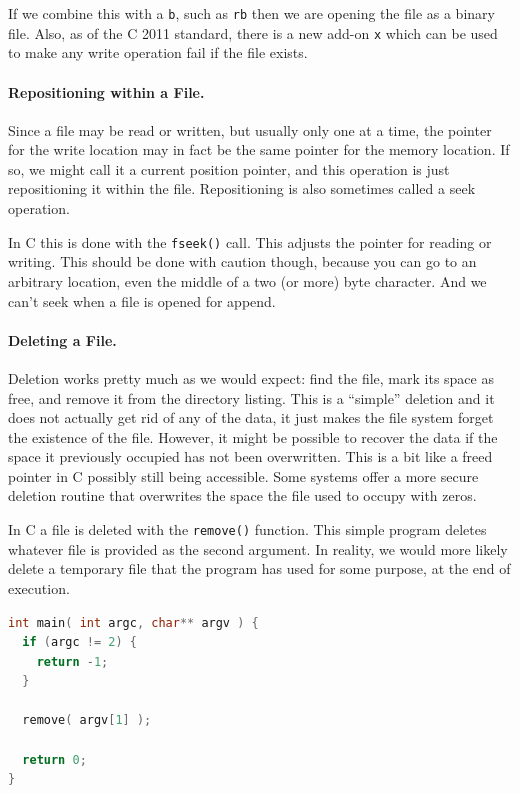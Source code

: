 \documentclass[a4paper]{report}
\begin{document}
If we combine this with a \texttt{b}, such as \texttt{rb} then we are opening the file as a binary file. Also, as of the C 2011 standard, there is a new add-on \texttt{x} which can be used to make any write operation fail if the file exists.

\paragraph{Repositioning within a File.} Since a file may be read or written, but usually only one at a time, the pointer for the write location may in fact be the same pointer for the memory location. If so, we might call it a current position pointer, and this operation is just repositioning it within the file. Repositioning is also sometimes called a seek operation.

In C this is done with the \texttt{fseek()} call. This adjusts the pointer for reading or writing. This should be done with caution though, because you can go to an arbitrary location, even the middle of a two (or more) byte character. And we can't seek when a file is opened for append.

\paragraph{Deleting a File.} Deletion works pretty much as we would expect: find the file, mark its space as free, and remove it from the directory listing. This is a ``simple'' deletion and it does not actually get rid of any of the data, it just makes the file system forget the existence of the file. However, it might be possible to recover the data if the space it previously occupied has not been overwritten. This is a bit like a freed pointer in C possibly still being accessible. Some systems offer a more secure deletion routine that overwrites the space the file used to occupy with zeros.

In C a file is deleted with the \texttt{remove()} function. This simple program deletes whatever file is provided as the second argument. In reality, we would more likely delete a temporary file that the program has used for some purpose, at the end of execution.

\begin{lstlisting}[language=C]
int main( int argc, char** argv ) {
  if (argc != 2) {
    return -1;
  }
  
  remove( argv[1] );

  return 0;
}    
\end{lstlisting}
\end{document}
